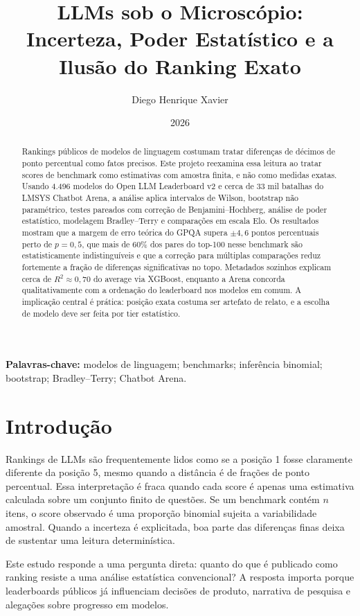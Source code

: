 \documentclass[11pt,a4paper]{article}
\title{LLMs sob o Microscópio:\\Incerteza, Poder Estatístico e a Ilusão do Ranking Exato}
\author{Diego Henrique Xavier}
\date{2026}
\begin{document}
\maketitle

\begin{abstract}
Rankings públicos de modelos de linguagem costumam tratar diferenças de décimos de ponto percentual como fatos precisos. Este projeto reexamina essa leitura ao tratar scores de benchmark como estimativas com amostra finita, e não como medidas exatas. Usando 4.496 modelos do Open LLM Leaderboard v2 e cerca de 33 mil batalhas do LMSYS Chatbot Arena, a análise aplica intervalos de Wilson, bootstrap não paramétrico, testes pareados com correção de Benjamini--Hochberg, análise de poder estatístico, modelagem Bradley--Terry e comparações em escala Elo. Os resultados mostram que a margem de erro teórica do GPQA supera \(\pm 4{,}6\) pontos percentuais perto de \(p=0{,}5\), que mais de 60\% dos pares do top-100 nesse benchmark são estatisticamente indistinguíveis e que a correção para múltiplas comparações reduz fortemente a fração de diferenças significativas no topo. Metadados sozinhos explicam cerca de \(R^2 \approx 0{,}70\) do average via XGBoost, enquanto a Arena concorda qualitativamente com a ordenação do leaderboard nos modelos em comum. A implicação central é prática: posição exata costuma ser artefato de relato, e a escolha de modelo deve ser feita por tier estatístico.
\end{abstract}

\textbf{Palavras-chave:} modelos de linguagem; benchmarks; inferência binomial; bootstrap; Bradley--Terry; Chatbot Arena.

\section{Introdução}
Rankings de LLMs são frequentemente lidos como se a posição 1 fosse claramente diferente da posição 5, mesmo quando a distância é de frações de ponto percentual. Essa interpretação é fraca quando cada score é apenas uma estimativa calculada sobre um conjunto finito de questões. Se um benchmark contém \(n\) itens, o score observado é uma proporção binomial sujeita a variabilidade amostral. Quando a incerteza é explicitada, boa parte das diferenças finas deixa de sustentar uma leitura determinística.

Este estudo responde a uma pergunta direta: quanto do que é publicado como ranking resiste a uma análise estatística convencional? A resposta importa porque leaderboards públicos já influenciam decisões de produto, narrativa de pesquisa e alegações sobre progresso em modelos.
\end{document}
